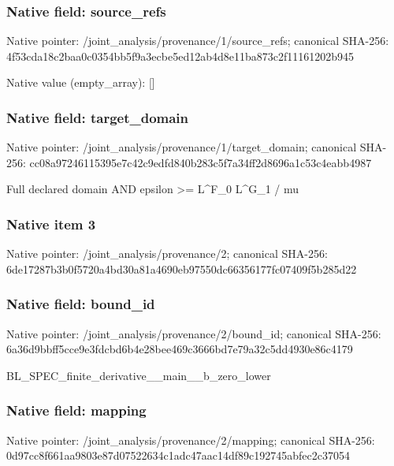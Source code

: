 \documentclass[10pt,a4paper]{article}
\begin{document}
\subsubsection{Native field: source\_\allowbreak{}refs}
Native pointer: /joint\_\allowbreak{}analysis/provenance/1/source\_\allowbreak{}refs; canonical SHA-256: 4f53cda18c2baa0c0354bb5f9a3ecbe5ed12ab4d8e11ba873c2f11161202b945

Native value (empty\_\allowbreak{}array): []

\subsubsection{Native field: target\_\allowbreak{}domain}
Native pointer: /joint\_\allowbreak{}analysis/provenance/1/target\_\allowbreak{}domain; canonical SHA-256: cc08a97246115395e7c42c9edfd840b283c5f7a34ff2d8696a1c53c4eabb4987

\begingroup\raggedright\sloppy Full declared domain AND epsilon >=\allowbreak{} L\textasciicircum{}F\_\allowbreak{}0 L\textasciicircum{}G\_\allowbreak{}1 /\allowbreak{} mu\par\endgroup

\subsubsection{Native item 3}
Native pointer: /joint\_\allowbreak{}analysis/provenance/2; canonical SHA-256: 6de17287b3b0f5720a4bd30a81a4690eb97550dc66356177fc07409f5b285d22

\subsubsection{Native field: bound\_\allowbreak{}id}
Native pointer: /joint\_\allowbreak{}analysis/provenance/2/bound\_\allowbreak{}id; canonical SHA-256: 6a36d9bbff5cce9e3fdcbd6b4e28bee469c3666bd7e79a32c5dd4930e86c4179

\begingroup\raggedright\sloppy BL\_\allowbreak{}SPEC\_\allowbreak{}finite\_\allowbreak{}derivative\_\allowbreak{}\_\allowbreak{}main\_\allowbreak{}\_\allowbreak{}b\_\allowbreak{}zero\_\allowbreak{}lower\par\endgroup

\subsubsection{Native field: mapping}
Native pointer: /joint\_\allowbreak{}analysis/provenance/2/mapping; canonical SHA-256: 0d97cc8f661aa9803e87d07522634c1adc47aac14df89c192745abfec2c37054
\end{document}
